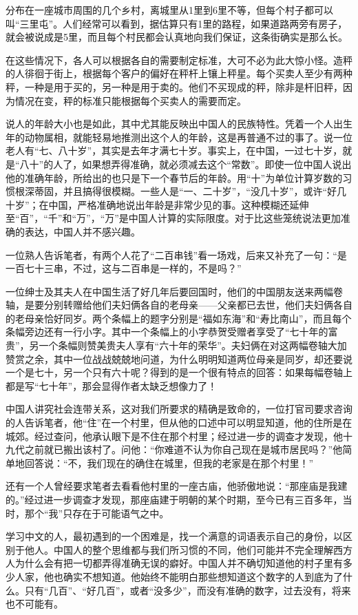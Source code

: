 \documentclass[12pt,oneside]{book}
\begin{document}
\begin{common-format}
分布在一座城市周围的几个乡村，离城里从1里到6里不等，但每个村子都可以叫“三里屯”。人们经常可以看到，据估算只有1里的路程，如果道路两旁有房子，就会被说成是5里，而且每个村民都会认真地向我们保证，这条街确实是那么长。 

在这些情况下，各人可以根据各自的需要制定标准，大可不必为此大惊小怪。造秤的人徘徊于街上，根据每个客户的偏好在秤杆上镶上秤星。每个买卖人至少有两种秤，一种是用于买的，另一种是用于卖的。他们不买现成的秤，除非是杆旧秤，因为情况在变，秤的标准只能根据每个买卖人的需要而定。 

说人的年龄大小也是如此，其中尤其能反映出中国人的民族特性。凭着一个人出生年的动物属相，就能轻易地推测出这个人的年龄，这是再普通不过的事了。说一位老人有“七、八十岁”，其实是去年才满七十岁。事实上，在中国，一过七十岁，就是“八十”的人了，如果想弄得准确，就必须减去这个“常数”。即使一位中国人说出他的准确年龄，所给出的也只是下一个春节后的年龄。用“十”为单位计算岁数的习惯根深蒂固，并且搞得很模糊。一些人是“一、二十岁”，“没几十岁”，或许“好几十岁”；在中国，严格准确地说出年龄是非常少见的事。这种模糊还延伸至“百”，“千”和“万”，“万”是中国人计算的实际限度。对于比这些笼统说法更加准确的表达，中国人并不感兴趣。 

一位熟人告诉笔者，有两个人花了“二百串钱”看一场戏，后来又补充了一句：“是一百七十三串，不过，这与二百串是一样的，不是吗？” 

一位绅士及其夫人在中国生活了好几年后要回国时，他们的中国朋友送来两幅卷轴，是要分别转赠给他们夫妇俩各自的老母亲——父亲都已去世，他们夫妇俩各自的老母亲恰好同岁。两个条幅上的题字分别是“福如东海”和“寿比南山”，而且每个条幅旁边还有一行小字。其中一个条幅上的小字恭贺受赠者享受了“七十年的富贵”，另一个条幅则赞美贵夫人享有“六十年的荣华”。夫妇俩在对这两幅卷轴大加赞赏之余，其中一位战战兢兢地问道，为什么明明知道两位母亲是同岁，却还要说一个是七十，另一个只有六十呢？得到的是一个很有特点的回答：如果每幅卷轴上都是写“七十年”，那会显得作者太缺乏想像力了！ 

中国人讲究社会连带关系，这对我们所要求的精确是致命的，一位打官司要求咨询的人告诉笔者，他“住”在一个村里，但从他的口述中可以明显知道，他的住所是在城郊。经过查问，他承认眼下是不住在那个村里；经过进一步的调查才发现，他十九代之前就已搬出该村了。问他：“你难道不认为你自己现在是城市居民吗？”他简单地回答说：“不，我们现在的确住在城里，但我的老家是在那个村里！” 

还有一个人曾经要求笔者去看看他村里的一座古庙，他骄傲地说：“那座庙是我建的。”经过进一步调查才发现，那座庙建于明朝的某个时期，至今已有三百多年，当时，那个“我”只存在于可能语气之中。 

学习中文的人，最初遇到的一个困难是，找一个满意的词语表示自己的身份，以区别于他人。中国人的整个思维都与我们所习惯的不同，他们可能并不完全理解西方人为什么会有把一切都弄得准确无误的癖好。中国人并不确切知道他的村子里有多少人家，他也确实不想知道。他始终不能明白那些想知道这个数字的人到底为了什么。只有“几百”、“好几百”，或者“没多少”，而没有准确的数字，过去没有，将来也不可能有。 


\end{common-format}
\end{document}
